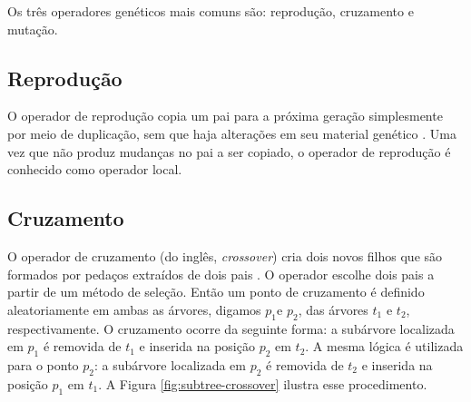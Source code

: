 Os três operadores genéticos mais comuns são: reprodução, cruzamento e mutação.

\subsection{Reprodução}
O operador de reprodução copia um pai para a próxima geração simplesmente por meio de duplicação, sem que haja alterações em seu material genético \cite{poli2008,banzhaf1998,koza1992}. Uma vez que não produz mudanças no pai a ser copiado, o operador de reprodução é conhecido como operador local.

\subsection{Cruzamento}
O operador de cruzamento (do inglês, \textit{crossover}) cria dois novos filhos que são formados por pedaços extraídos de dois pais \cite{poli2008,banzhaf1998,koza1992}. O operador escolhe dois pais a partir de um método de seleção. Então um ponto de cruzamento é definido aleatoriamente em ambas as árvores, digamos $p_1$e $p_2$, das árvores $t_1$ e $t_2$, respectivamente. O cruzamento ocorre da seguinte forma: a subárvore localizada em $p_1$ é removida de $t_1$ e inserida na posição $p_2$ em $t_2$. A mesma lógica é utilizada para o ponto $p_2$: a subárvore localizada em $p_2$ é removida de $t_2$ e inserida na posição $p_1$ em $t_1$. A Figura \ref{fig:subtree-crossover} ilustra esse procedimento.

